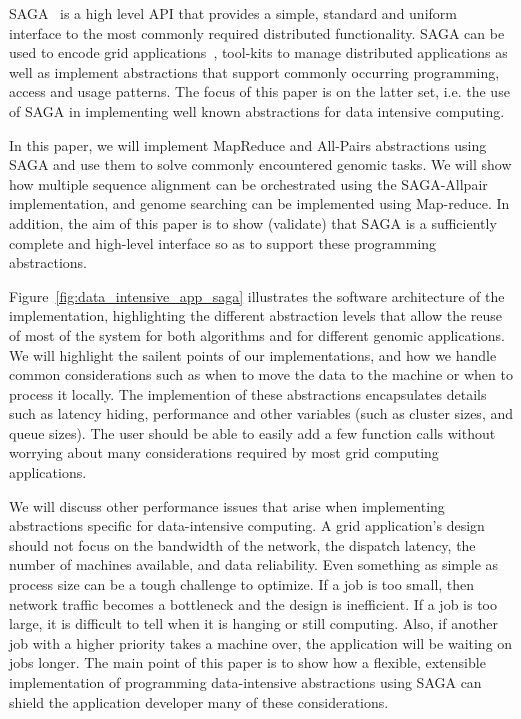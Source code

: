 \documentclass[a4paper,11pt]{article}
\begin{document}
SAGA~\cite{saga_gfd90} is a high level API that provides a simple,
standard and uniform interface to the most commonly required
distributed functionality.  SAGA can be used to encode grid
applications~\cite{saga_escience07, saga_tg08}, tool-kits to manage
distributed applications as well as implement abstractions that
support commonly occurring programming, access and usage patterns.
The focus of this paper is on the latter set, i.e.  the use of SAGA in
implementing well known abstractions for data intensive computing.

In this paper, we will implement MapReduce and All-Pairs abstractions
using SAGA and use them to solve commonly encountered genomic tasks.
We will show how multiple sequence alignment can be orchestrated using
the SAGA-Allpair implementation, and genome searching can be
implemented using Map-reduce.  In addition, the aim of this paper is
to show (validate) that SAGA is a sufficiently complete and high-level
interface so as to support these programming abstractions.

Figure~\ref{fig:data_intensive_app_saga} illustrates the software
architecture of the implementation, highlighting the different
abstraction levels that allow the reuse of most of the system for both
algorithms and for different genomic applications.  We will highlight
the sailent points of our implementations, and how we handle common
considerations such as when to move the data to the machine or when to
process it locally.  The implemention of these abstractions
encapsulates details such as latency hiding, performance and other
variables (such as cluster sizes, and queue sizes).  The user should
be able to easily add a few function calls without worrying about many
considerations required by most grid computing applications.

We will discuss other performance issues that arise when implementing
abstractions specific for data-intensive computing.  A grid
application's design should not focus on the bandwidth of the network,
the dispatch latency, the number of machines available, and data
reliability.  Even something as simple as process size can be a tough
challenge to optimize.  If a job is too small, then network traffic
becomes a bottleneck and the design is inefficient.  If a job is too
large, it is difficult to tell when it is hanging or still computing.
Also, if another job with a higher priority takes a machine over, the
application will be waiting on jobs longer.  The main point of this
paper is to show how a flexible, extensible implementation of
programming data-intensive abstractions using SAGA can shield the
application developer many of these considerations.
\end{document}
